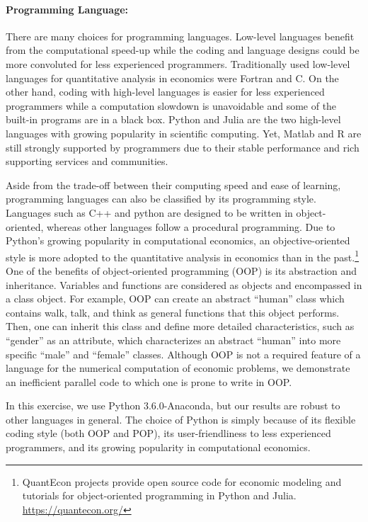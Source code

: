 \documentclass[12pt]{article}
\begin{document}
\paragraph{Programming Language:} There are many choices for programming languages. Low-level languages benefit from the computational speed-up while the coding and language designs could be more convoluted for less experienced programmers. Traditionally used low-level languages for quantitative analysis in economics were Fortran and C. On the other hand, coding with high-level languages is easier for less experienced programmers while a computation slowdown is unavoidable and some of the built-in programs are in a black box. Python and Julia are the two high-level languages with growing popularity in scientific computing. Yet, Matlab and R are still strongly supported by programmers due to their stable performance and rich supporting services and communities.

Aside from the trade-off between their computing speed and ease of learning, programming languages can also be classified by its programming style. Languages such as C++ and python are designed to be written in object-oriented, whereas other languages follow a procedural programming. Due to Python's growing popularity in computational economics, an objective-oriented style is more adopted to the quantitative analysis in economics than in the past.\footnote{\sf QuantEcon projects provide open source code for economic modeling and tutorials for object-oriented programming in Python and Julia. \url{https://quantecon.org/}} One of the benefits of object-oriented programming (OOP) is its abstraction and inheritance. Variables and functions are considered as objects and encompassed in a class object. For example, OOP can create an abstract ``human'' class which contains walk, talk, and think as general functions that this object performs. Then, one can inherit this class and define more detailed characteristics, such as ``gender'' as an attribute, which characterizes an abstract ``human'' into more specific ``male'' and ``female'' classes. Although OOP is not a required feature of a language for the numerical computation of economic problems, we demonstrate an inefficient parallel code to which one is prone to write in OOP.

In this exercise, we use Python 3.6.0-Anaconda, but our results are robust to other languages in general. The choice of Python is simply because of its flexible coding style (both OOP and POP), its user-friendliness to less experienced programmers, and its growing popularity in computational economics.
\end{document}
